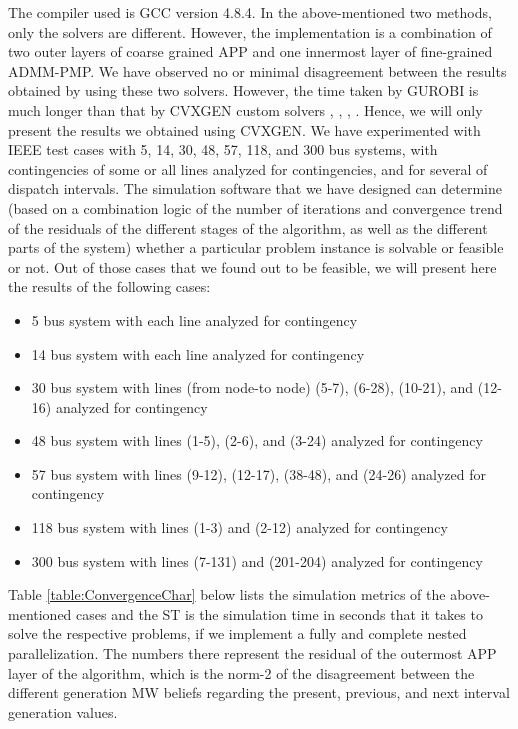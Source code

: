 \documentclass[preprint,12pt,3p]{elsarticle}
\begin{document}
The compiler used is GCC version 4.8.4. In the above-mentioned two methods, only the solvers are different. However, the implementation is a combination of two outer layers of coarse grained APP and one innermost layer of fine-grained ADMM-PMP. We have observed no or minimal disagreement between the results obtained by using these two solvers. However, the time taken by GUROBI is much longer than that by CVXGEN custom solvers \cite{cvxgen01}, \cite{cvxgen02}, \cite{cvxgen03}, \cite{cvxgen04}. Hence, we will only present the results we obtained using CVXGEN. We have experimented with IEEE test cases with 5, 14, 30, 48, 57, 118, and 300 bus systems, with contingencies of some or all lines analyzed for contingencies, and for several of dispatch intervals. The simulation software that we have designed can determine (based on a combination logic of the number of iterations and convergence trend of the residuals of the different stages of the algorithm, as well as the different parts of the system) whether a particular problem instance is solvable or feasible or not. Out of those cases that we found out to be feasible, we will present here the results of the following cases:\\
\begin{itemize}
    \item 5 bus system with each line analyzed for contingency
    \item 14 bus system with each line analyzed for contingency
    \item 30 bus system with lines (from node-to node) (5-7), (6-28), (10-21), and (12-16) analyzed for contingency
    \item 48 bus system with lines (1-5), (2-6), and (3-24) analyzed for contingency
    \item 57 bus system with lines (9-12), (12-17), (38-48), and (24-26) analyzed for contingency
    \item 118 bus system with lines (1-3) and (2-12) analyzed for contingency
    \item 300 bus system with lines (7-131) and (201-204) analyzed for contingency
\end{itemize}
Table \ref{table:ConvergenceChar} below lists the simulation metrics of the above-mentioned cases and the ST is the simulation time in seconds that it takes to solve the respective problems, if we implement a fully and complete nested parallelization. The numbers there represent the residual of the outermost APP layer of the algorithm, which is the norm-2 of the disagreement between the different generation MW beliefs regarding the present, previous, and next interval generation values. 
\end{document}
